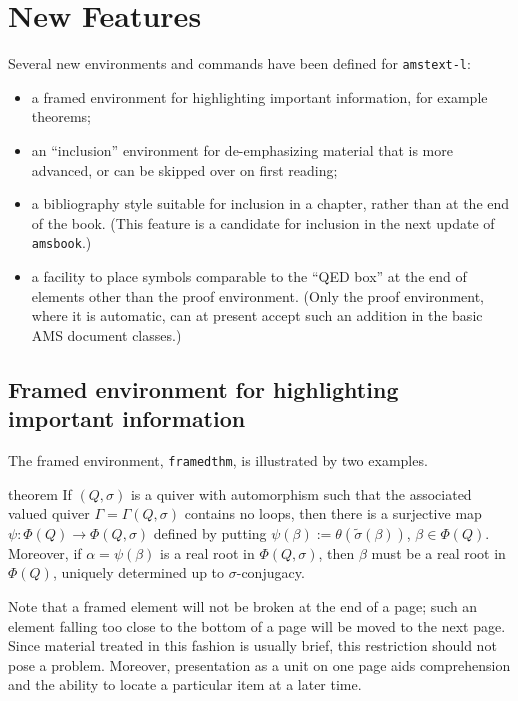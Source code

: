 \documentclass[multixcb]{amstext-l}
\theoremstyle{plain}
\theoremstyle{definition}
\newcommand{\cls}[1]{\texttt{#1}}
\begin{document}
\chapter{New Features}

Several new environments and commands have been defined for
\cls{amstext-l}:
\begin{itemize}
\item a framed environment for highlighting important
  information, for example theorems;
\item an ``inclusion'' environment for de-emphasizing material
  that is more advanced, or can be skipped over on first reading;
\item a bibliography style suitable for inclusion in a chapter,
  rather than at the end of the book.  (This feature is a candidate
  for inclusion in the next update of \cls{amsbook}.)
\item a facility to place symbols comparable to the ``QED box'' at
  the end of elements other than the proof environment.  (Only the
  proof environment, where it is automatic, can at present accept
  such an addition in the basic AMS document classes.)
\end{itemize}

\section{Framed environment for highlighting important information}

The framed environment, \verb+framedthm+, is illustrated by two examples.

\begin{framedthm}{theorem}
If $(Q,\sigma)$ is a quiver with automorphism such that the
associated valued quiver $\Gamma=\Gamma(Q,\sigma)$ contains no
loops, then there is a surjective map $\psi\colon
\Phi(Q)\to\Phi(Q,\sigma)$ defined by putting $\psi(\beta):=
\theta(\tilde\sigma(\beta))$, $\beta\in\Phi(Q)$. Moreover, if
$\alpha=\psi(\beta)$ is a real root in $\Phi(Q,\sigma)$, then
$\beta$ must be a real root in $\Phi(Q)$, uniquely determined up
to $\sigma$-conjugacy.
\end{framedthm}

Note that a framed element will not be broken at the end of a
page; such an element falling too close to the bottom of a page
will be moved to the next page.  Since material treated in this
fashion is usually brief, this restriction should not pose a
problem.  Moreover, presentation as a unit on one
page aids comprehension and the ability to locate a particular
item at a later time.
\end{document}
